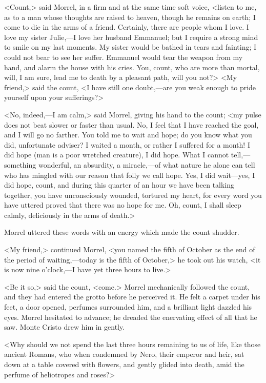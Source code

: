  <Count,> said Morrel, in a firm and at the same time soft voice, <listen to me, as to a man whose thoughts are raised to heaven, though he remains on earth; I come to die in the arms of a friend. Certainly, there are people whom I love. I love my sister Julie,—I love her husband Emmanuel; but I require a strong mind to smile on my last moments. My sister would be bathed in tears and fainting; I could not bear to see her suffer. Emmanuel would tear the weapon from my hand, and alarm the house with his cries. You, count, who are more than mortal, will, I am sure, lead me to death by a pleasant path, will you not?>  <My friend,> said the count, <I have still one doubt,—are you weak enough to pride yourself upon your sufferings?> 

 <No, indeed,—I am calm,> said Morrel, giving his hand to the count; <my pulse does not beat slower or faster than usual. No, I feel that I have reached the goal, and I will go no farther. You told me to wait and hope; do you know what you did, unfortunate adviser? I waited a month, or rather I suffered for a month! I did hope (man is a poor wretched creature), I did hope. What I cannot tell,—something wonderful, an absurdity, a miracle,—of what nature he alone can tell who has mingled with our reason that folly we call hope. Yes, I did wait—yes, I did hope, count, and during this quarter of an hour we have been talking together, you have unconsciously wounded, tortured my heart, for every word you have uttered proved that there was no hope for me. Oh, count, I shall sleep calmly, deliciously in the arms of death.> 

 Morrel uttered these words with an energy which made the count shudder. 

 <My friend,> continued Morrel, <you named the fifth of October as the end of the period of waiting,—today is the fifth of October,> he took out his watch, <it is now nine o'clock,—I have yet three hours to live.> 

 <Be it so,> said the count, <come.> Morrel mechanically followed the count, and they had entered the grotto before he perceived it. He felt a carpet under his feet, a door opened, perfumes surrounded him, and a brilliant light dazzled his eyes. Morrel hesitated to advance; he dreaded the enervating effect of all that he saw. Monte Cristo drew him in gently. 

 <Why should we not spend the last three hours remaining to us of life, like those ancient Romans, who when condemned by Nero, their emperor and heir, sat down at a table covered with flowers, and gently glided into death, amid the perfume of heliotropes and roses?> 

